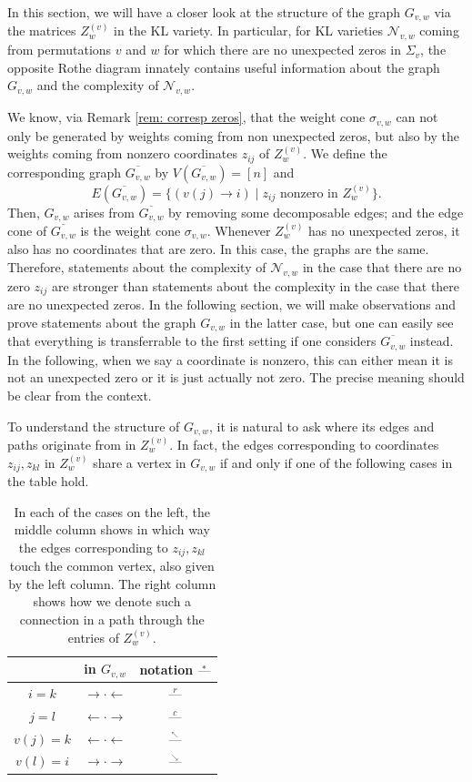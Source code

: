 \documentclass[11pt]{amsart}
\theoremstyle{definition}
\theoremstyle{definition}
\theoremstyle{definition}
\theoremstyle{definition}
\newcommand{\Gvwt}{G_{v,w}}
\newcommand{\Nvw}{\mathcal{N}_{v,w}}
\newcommand{\dash}{\text{---}}
\newcommand{\Zg}{Z^{(v)}_w}
\newcommand{\Gvwtt}{\overline{G_{v,w}}}
\begin{document}
\noindent In this section, we will have a closer look at the structure of the graph $\Gvwt$ via the matrices $Z^{(v)}_w$ in the KL variety. In particular, for KL varieties $\Nvw$ coming from permutations $v$ and $w$ for which there are no unexpected zeros in $\Sigma_v$, the opposite Rothe diagram innately contains useful information about the graph $\Gvwt$ and the complexity of $\Nvw$. 

We know, via Remark \ref{rem: corresp zeros}, that the weight cone $\sigma_{v,w}$ can not only be generated by weights coming from non unexpected zeros, but also by the weights coming from nonzero coordinates $z_{ij}$ of $\Zg$. We define the corresponding graph
$\Gvwtt$ by $V(\Gvwtt) = [n]$ and
$$E(\Gvwtt) = \{ (v(j) \to i) \mid z_{ij} \textrm{ nonzero in } \Zg \}.$$
Then, $\Gvwt$ arises from $\Gvwtt$ by removing some decomposable edges; and the edge cone of $\Gvwtt$ is the weight cone $\sigma_{v,w}$. Whenever $\Zg$ has no unexpected zeros, it also has no coordinates that are zero. In this case, the graphs are the same. Therefore, statements about the complexity of $\Nvw$ in the case that there are no zero $z_{ij}$ are stronger than statements about the complexity in the case that there are no unexpected zeros. In the following section, we will make observations and prove statements about the graph $\Gvwt$ in the latter case, but one can easily see that everything is transferrable to the first setting if one considers $\Gvwtt$ instead. In the following, when we say a coordinate is nonzero, this can either mean it is not an unexpected zero or it is just actually not zero. The precise meaning should be clear from the context.

To understand the structure of $\Gvwt$, it is natural to ask where its edges and paths originate from in $\Zg$. 
In fact, the edges corresponding to coordinates $z_{ij}, z_{kl}$ in $\Zg$ share a vertex in $\Gvwt$ if and only if one of the following cases in the table hold.


\begin{table}[H]
\centering
\begin{tabular}{c|c|c}
     & in $\Gvwt$ & notation $\stackrel{\ast}{\dash}$\\
     \hline
    $i=k$ & $\rightarrow \boldsymbol{\cdot} \leftarrow$ & $\stackrel{r}{\dash}$\\
    $j=l$ & $\leftarrow \boldsymbol{\cdot} \rightarrow$ & $\stackrel{c}{\dash}$\\    
    $v(j) =k$ & $\leftarrow \boldsymbol{\cdot} \leftarrow$ & $\stackrel{_{\nwarrow}}{\dash}$\\
    $v(l) =i$ & $\rightarrow \boldsymbol{\cdot} \rightarrow$ &  $\stackrel{_{\searrow}}{\dash}$  
\end{tabular} \\
\caption{\small{In each of the cases on the left, the middle column shows in which way the edges corresponding to $z_{ij},z_{kl}$ touch the common vertex, also given by the left column. The right column shows how we denote such a connection in a path through the entries of $\Zg$. }}
\label{table}
\end{table}
\end{document}
